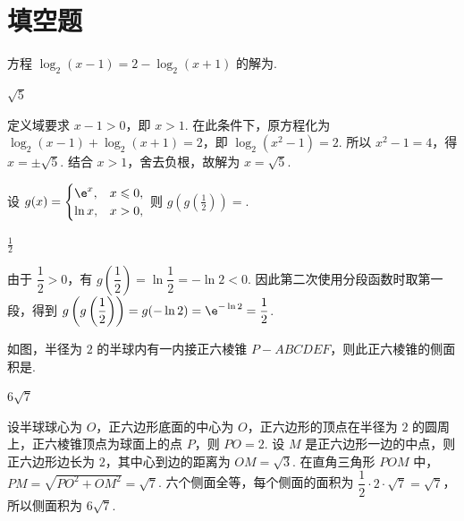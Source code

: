 \section{填空题}
\begin{problem}
方程 \(\log_2(x - 1) = 2 - \log_2(x + 1)\) 的解为\fillinblank{}.
\end{problem}

\begin{answer}
\(\sqrt{5}\)
\end{answer}

\begin{solution}
定义域要求 \(x-1>0\)，即 \(x>1\). 在此条件下，原方程化为 \(\log_2(x-1)+\log_2(x+1)=2\)，即 \(\log_2(x^2-1)=2\). 所以 \(x^2-1=4\)，得 \(x=\pm\sqrt5\). 结合 \(x>1\)，舍去负根，故解为 \(x=\sqrt5\).
\end{solution}

\begin{problem}
设 \( g(x)=\begin{cases}
\e^{x},&x\leqslant0,\\
\ln x,&x>0,
\end{cases} \) 则 \( g\left(g\left(\frac{1}{2}\right)\right)= \)\fillinblank{}.
\end{problem}

\begin{answer}
\(\frac{1}{2}\)
\end{answer}

\begin{solution}
由于 \(\dfrac12>0\)，有 \(g\left(\dfrac12\right)=\ln\dfrac12=-\ln2<0\). 因此第二次使用分段函数时取第一段，得到 \(g\left(g\left(\dfrac12\right)\right)=g(-\ln2)=\e^{-\ln2}=\dfrac12\).
\end{solution}

\begin{problem}
如图，半径为 \(2\) 的半球内有一内接正六棱锥 \(P - ABCDEF\)，则此正六棱锥的侧面积是\fillinblank{}.

\FloatBarrier
\end{problem}

\begin{answer}
\(6\sqrt{7}\)
\end{answer}

\begin{solution}
设半球球心为 \(O\)，正六边形底面的中心为 \(O\)，正六边形的顶点在半径为 \(2\) 的圆周上，正六棱锥顶点为球面上的点 \(P\)，则 \(PO=2\). 设 \(M\) 是正六边形一边的中点，则正六边形边长为 \(2\)，其中心到边的距离为 \(OM=\sqrt3\). 在直角三角形 \(POM\) 中，\(PM=\sqrt{PO^2+OM^2}=\sqrt7\). 六个侧面全等，每个侧面的面积为 \(\dfrac12\cdot2\cdot\sqrt7=\sqrt7\)，所以侧面积为 \(6\sqrt7\).
\end{solution}

